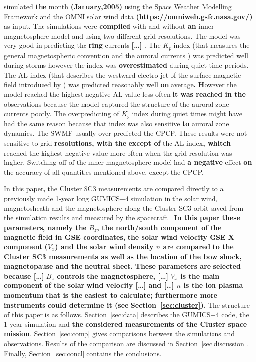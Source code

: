 \documentclass[linenumbers,draft]{agujournal}
\begin{document}
\citet{haiducek17:_swmf_global_magnet_simul_januar} simulated \textbf{the} month \textbf{(January,2005)} using the Space Weather Modelling Framework \citep[SWMF;][]{toth05:_space_weath_model_framew} and the OMNI solar wind data \textbf{(https://omniweb.gsfc.nasa.gov/)} as input. The simulations were \textbf{compiled} with and without \textbf{an} inner magnetosphere model and using two different grid resolutions. The model was very good in predicting the \textbf{ring} currents \textbf{[\dots]} \citep[SYM-H; http://wdc.kugi.kyoto-u.ac.jp/aeasy/asy.pdf;][]{iyemori90:_storm}. The $K_p$ index (that measures the general magnetospheric convention and the auroral currents \citep{bartels39,rostoker72:_geomag,thomsen04:_why_kp}) was predicted well during storms however the index was \textbf{overestimated} during quiet time periods. The AL index (that describes the westward electro jet of the surface magnetic field introduced by \citet{davis66:_auror_ae}) was predicted reasonably well \textbf{on} average\textbf{.} \textbf{H}owever the model reached the highest negative AL value less often \textbf{it was reached in the} observations because the model captured the structure of the auroral zone currents poorly. The overpredicting of $K_p$ index during quiet times might have had the same reason because that index was also sensitive \textbf{to} auroral zone dynamics. The SWMF usually over predicted the CPCP. These results were not sensitive to grid \textbf{resolutions, with the except of} the AL index\textbf{, whitch} reached the highest negative value more often when the grid resolution was higher. Switching off of the inner magnetosphere model had \textbf{a negative} effect \textbf{on} the accuracy of all quantities mentioned above, except the CPCP. 

In this paper\textbf{,} the Cluster SC3 measurements are compared directly to a previously made 1-year long GUMICS$-$4 simulation in the solar wind, magnetosheath and the magnetosphere along the Cluster SC3 orbit saved from the simulation results and measured by the spacecraft \citep{facsko16:_one_earth}. \textbf{In this paper these parameters, namely the $B_z$\textbf{, the north/south component of the} magnetic field \textbf{in} GSE \textbf{coordinates}, the solar wind velocity GSE X component ($V_x$) and the solar wind density $n$ are compared to the Cluster SC3 measurement\textbf{s} as well as the location of the bow shock, magnetopause and the neutral sheet. These parameters are selected because \textbf{[\dots]} $B_z$ controls the magnetosphere, \textbf{[\dots]} $V_x$ is the main \textbf{component of the} solar wind velocity \textbf{[\dots]} and \textbf{[\dots]} $n$ is the ion plasma momentum that is the easiest to calculate; furthermore more instruments could determine it (see Section~\ref{sec:cluster}).}  The structure of this paper is as follows. Section~\ref{sec:data} describes the GUMICS$-$4 code, the 1-year simulation and \textbf{the considered measurements of the Cluster space mission}. Section~\ref{sec:comp} gives comparisons between the simulations and observations. Results of the comparison are discussed in Section~\ref{sec:discussion}. Finally, Section~\ref{sec:concl} contains the conclusions.
\end{document}
